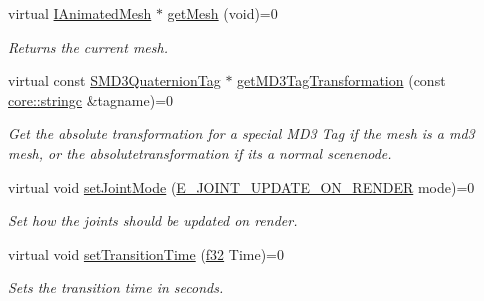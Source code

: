 \begin{DoxyCompactItemize}
\mbox{\label{classirr_1_1scene_1_1IAnimatedMeshSceneNode_ad52e5bd15a2bfb6d0745c77d4329086b}} 
virtual \hyperlink{classirr_1_1scene_1_1IAnimatedMesh}{I\+Animated\+Mesh} $\ast$ \hyperlink{classirr_1_1scene_1_1IAnimatedMeshSceneNode_ad52e5bd15a2bfb6d0745c77d4329086b}{get\+Mesh} (void)=0
\begin{DoxyCompactList}\small\item\em Returns the current mesh. \end{DoxyCompactList}\item 
\mbox{\label{classirr_1_1scene_1_1IAnimatedMeshSceneNode_abb3c2cee9c3271014c8615907d98c021}} 
virtual const \hyperlink{structirr_1_1scene_1_1SMD3QuaternionTag}{S\+M\+D3\+Quaternion\+Tag} $\ast$ \hyperlink{classirr_1_1scene_1_1IAnimatedMeshSceneNode_abb3c2cee9c3271014c8615907d98c021}{get\+M\+D3\+Tag\+Transformation} (const \hyperlink{namespaceirr_1_1core_ab26a0e0359206b5a694f35c37c829d7f}{core\+::stringc} \&tagname)=0
\begin{DoxyCompactList}\small\item\em Get the absolute transformation for a special M\+D3 Tag if the mesh is a md3 mesh, or the absolutetransformation if it\textquotesingle{}s a normal scenenode. \end{DoxyCompactList}\item 
\mbox{\label{classirr_1_1scene_1_1IAnimatedMeshSceneNode_a5ff68cb07badfbb01f491c0371c8b459}} 
virtual void \hyperlink{classirr_1_1scene_1_1IAnimatedMeshSceneNode_a5ff68cb07badfbb01f491c0371c8b459}{set\+Joint\+Mode} (\hyperlink{namespaceirr_1_1scene_a4a36461b5fa197ca3c6636c043413fa5}{E\+\_\+\+J\+O\+I\+N\+T\+\_\+\+U\+P\+D\+A\+T\+E\+\_\+\+O\+N\+\_\+\+R\+E\+N\+D\+ER} mode)=0
\begin{DoxyCompactList}\small\item\em Set how the joints should be updated on render. \end{DoxyCompactList}\item 
virtual void \hyperlink{classirr_1_1scene_1_1IAnimatedMeshSceneNode_a424d2dc577842949094a9d8c2a3eba0e}{set\+Transition\+Time} (\hyperlink{namespaceirr_a0277be98d67dc26ff93b1a6a1d086b07}{f32} Time)=0
\begin{DoxyCompactList}\small\item\em Sets the transition time in seconds. \end{DoxyCompactList}\item 

\end{DoxyCompactItemize}
